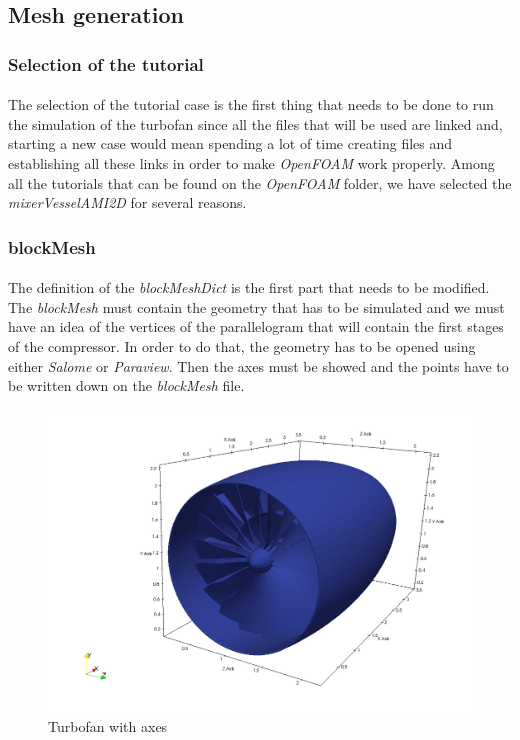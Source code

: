 \subsection{Mesh generation}

\subsubsection{Selection of the tutorial}

\paragraph{}The selection of the tutorial case is the first thing that needs to be done to run the simulation of the turbofan since all the files that will be used are linked and, starting a new case would mean spending a lot of time creating files and establishing all these links in order to make \textit{OpenFOAM} work properly. Among all the tutorials that can be found on the \textit{OpenFOAM} folder, we have selected the \textit{mixerVesselAMI2D} for several reasons. 

\subsubsection{blockMesh}

\paragraph{}The definition of the \textit{blockMeshDict} is the first part that needs to be modified. The \textit{blockMesh} must contain the geometry that has to be simulated and we must have an idea of the vertices of the parallelogram that will contain the first stages of the compressor. In order to do that, the geometry has to be opened using either \textit{Salome} or \textit{Paraview}. Then the axes must be showed and the points have to be written down on the \textit{blockMesh} file.

\begin{figure}
\includegraphics[scale=0.30]{./img/geometryAxes}
\centering
\caption{Turbofan with axes}
\label{axisparaview}
\end{figure}

